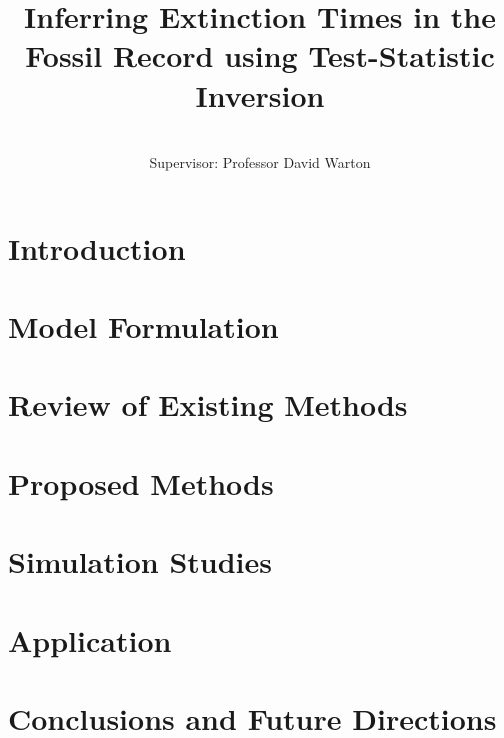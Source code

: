 \documentclass[honours,12pt]{UNSWthesis}
\title{Inferring Extinction Times in the Fossil Record using Test-Statistic Inversion}
\author{\Authornameonly\\{\bigskip}Supervisor: Professor David Warton}
\begin{document}
%
%

\beforepreface

\afterpage{\blankpage}



% 



\afterpreface

\afterpage{\blankpage}

%
%

\chapter{Introduction}\label{chap: intro}


\chapter{Model Formulation}\label{chap: assumptions}


\chapter{Review of Existing Methods}\label{chap: existing-methods}


\chapter{Proposed Methods}\label{chap: proposed-methods}


\chapter{Simulation Studies}\label{chap: simulation-experiments}


\chapter{Application}\label{chap: applications}


\chapter{Conclusions and Future Directions}\label{chap: conclusions}

\end{document}
